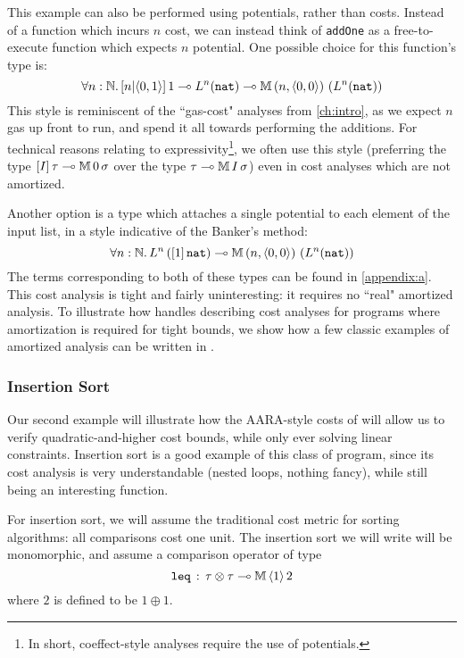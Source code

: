 This example can also be performed using potentials, rather than costs. Instead of a function which incurs $n$ cost, we can instead think of \texttt{addOne} as a free-to-execute function which expects $n$ potential. One possible choice for this function's type is:
$$\forall n : \mathbb{N} .\, [n|\langle 0,1 \rangle] \, 1 \multimap L^n(\texttt{nat}) \multimap \mathbb{M} \, (n,\langle 0,0 \rangle) \, \left(L^n(\texttt{nat})\right)$$
This style is reminiscent of the ``gas-cost" analyses from \autoref{ch:intro}, as we expect $n$ gas up front to run, and spend it all towards performing the additions. For technical reasons relating to expressivity\footnote{
In short, coeffect-style analyses require the use of potentials.
}, we often use this style (preferring the type $[I] \, \tau \multimap \mathbb{M} \, 0 \, \sigma$ over the type $\tau \multimap \mathbb{M} \, I \, \sigma$) even in cost analyses which are not amortized.

Another option is a type which attaches a single potential to each element of the input list, in a style indicative of the Banker's method:
$$
\forall n : \mathbb{N} .\, L^n\left([1] \, \texttt{nat}\right) \multimap \mathbb{M} \, (n,\langle 0,0 \rangle) \, \left(L^n(\texttt{nat})\right)
$$
The terms corresponding to both of these types can be found in \autoref{appendix:a}. This cost analysis is tight and fairly uninteresting: it requires no ``real" amortized analysis. To illustrate how \dlambdaamor handles describing cost analyses for programs where amortization is required for tight bounds, we show how a few classic examples of amortized analysis can be written in \dlambdaamor.

\subsubsection{Insertion Sort}
Our second example will illustrate how the AARA-style costs of \dlambdaamor will allow us to verify quadratic-and-higher cost bounds, while only ever solving linear constraints. Insertion sort is a good example of this class of program, since its cost analysis is very understandable (nested loops, nothing fancy), while still being an interesting function.

For insertion sort, we will assume the traditional cost metric for sorting algorithms: all comparisons cost one unit. The insertion sort we will write will be monomorphic, and assume a comparison operator of type
$$
\texttt{leq} \, : \, \tau \otimes \tau \multimap \mathbb{M} \, \langle 1 \rangle \, 2
$$
where $2$ is defined to be $1 \oplus 1$.


